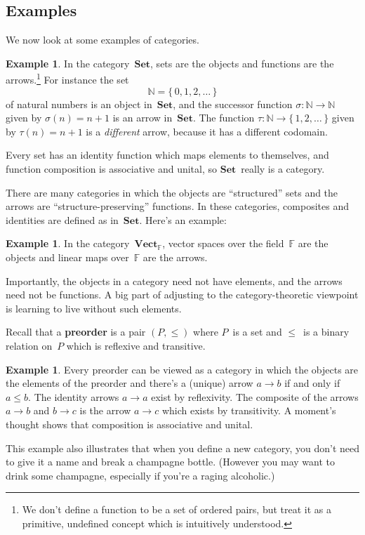 \documentclass[letterpaper,12pt]{article}
\newcommand{\N}{\mathbb{N}}
\newcommand{\F}{\mathbb{F}}
\newcommand{\cat}[1]{\mathbf{#1}}
\newcommand{\Set}{\cat{Set}}
\newcommand{\Vect}{\cat{Vect}}
\newcommand{\textdefn}{\textbf}
\theoremstyle{definition}
\newtheorem{exmp}[equation]{Example}
\theoremstyle{plain}
\numberwithin{equation}{section}
\begin{document}
\subsection{Examples}
We now look at some examples of categories.
\begin{exmp}
In the category~\(\Set\), sets are the objects and functions are the arrows.\footnote{We don't define a function to be a set of ordered pairs, but treat it as a primitive, undefined concept which is intuitively understood.} For instance the set
\[\N=\{\,0,1,2,\ldots\,\}\]
of natural numbers is an object in~\(\Set\), and the successor function \(\sigma:\N\to\N\) given by \(\sigma(n)=n+1\) is an arrow in~\(\Set\). The function \(\tau:\N\to\{\,1,2,\ldots\,\}\) given by \(\tau(n)=n+1\) is a \emph{different} arrow, because it has a different codomain.

Every set has an identity function which maps elements to themselves, and function composition is associative and unital, so \(\Set\)~really is a category.
\end{exmp}

\noindent There are many categories in which the objects are ``structured'' sets and the arrows are ``structure-preserving'' functions. In these categories, composites and identities are defined as in~\(\Set\). Here's an example:
\begin{exmp}
In the category~\(\Vect_{\F}\), vector spaces over the field~\(\F\) are the objects and linear maps over~\(\F\) are the arrows.
\end{exmp}

\noindent Importantly, the objects in a category need not have elements, and the arrows need not be functions. A big part of adjusting to the category-theoretic viewpoint is learning to live without such elements.

Recall that a \textdefn{preorder} is a pair \((P,{\le})\) where \(P\)~is a set and \({\le}\)~is a binary relation on~\(P\) which is reflexive and transitive.
\begin{exmp}
Every preorder can be viewed as a category in which the objects are the elements of the preorder and there's a (unique) arrow \(a\to b\) if and only if \(a\le b\). The identity arrows \(a\to a\) exist by reflexivity. The composite of the arrows \(a\to b\) and \(b\to c\) is the arrow \(a\to c\) which exists by transitivity. A moment's thought shows that composition is associative and unital.
\end{exmp}
\noindent This example also illustrates that when you define a new category, you don't need to give it a name and break a champagne bottle. (However you may want to drink some champagne, especially if you're a raging alcoholic.)
\end{document}
